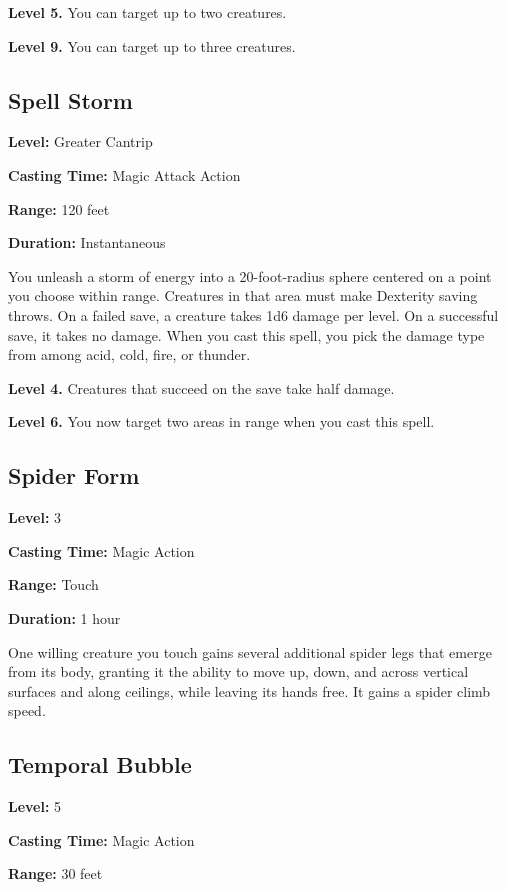 \documentclass[12pt,letterpaper,twocolumn,openany,nodeprecatedcode,bg=none]{dndbook}
\begin{document}
\textbf{Level 5.} You can target up to two creatures.

\textbf{Level 9.} You can target up to three creatures.

\subsection{Spell Storm}\label{spell-storm}

\textbf{Level:} Greater Cantrip

\textbf{Casting Time:} Magic Attack Action

\textbf{Range:} 120 feet

\textbf{Duration:} Instantaneous

You unleash a storm of energy into a 20-foot-radius sphere centered on a
point you choose within range. Creatures in that area must make
Dexterity saving throws. On a failed save, a creature takes 1d6 damage
per level. On a successful save, it takes no damage. When you cast this
spell, you pick the damage type from among acid, cold, fire, or thunder.

\textbf{Level 4.} Creatures that succeed on the save take half damage.

\textbf{Level 6.} You now target two areas in range when you cast this
spell.

\clearpage

\subsection{Spider Form}\label{spider-form}

\textbf{Level:} 3

\textbf{Casting Time:} Magic Action

\textbf{Range:} Touch

\textbf{Duration:} 1 hour

One willing creature you touch gains several additional spider legs that
emerge from its body, granting it the ability to move up, down, and
across vertical surfaces and along ceilings, while leaving its hands
free. It gains a spider climb speed.

\subsection{Temporal Bubble}\label{temporal-bubble}

\textbf{Level:} 5

\textbf{Casting Time:} Magic Action

\textbf{Range:} 30 feet
\end{document}
